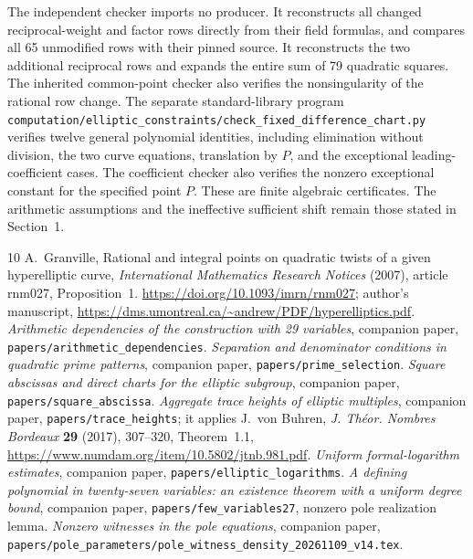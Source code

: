 \documentclass[11pt,a4paper]{article}
\begin{document}
The independent checker imports no producer. It reconstructs all
changed reciprocal-weight and factor rows directly from their field
formulas, and compares all 65 unmodified rows with their pinned source.
It reconstructs the two additional reciprocal rows and expands the
entire sum of 79 quadratic squares. The inherited common-point checker
also verifies the nonsingularity of the rational row change. The separate
standard-library program
\nolinkurl{computation/elliptic_constraints/check_fixed_difference_chart.py}
verifies twelve general polynomial identities, including elimination
without division, the two curve equations, translation by $P$, and the
exceptional leading-coefficient cases. The coefficient checker also
verifies the nonzero exceptional constant for the specified point $P$.
These are finite algebraic certificates. The arithmetic assumptions and
the ineffective sufficient shift remain those stated in Section~1.

\begin{thebibliography}{10}
A.~Granville, Rational and integral points on quadratic twists of a given
hyperelliptic curve, \emph{International Mathematics Research Notices}
(2007), article rnm027, Proposition~1.
\url{https://doi.org/10.1093/imrn/rnm027}; author's manuscript,
\url{https://dms.umontreal.ca/~andrew/PDF/hyperelliptics.pdf}.
\emph{Arithmetic dependencies of the construction with 29 variables},
companion paper, \nolinkurl{papers/arithmetic_dependencies}.
\emph{Separation and denominator conditions in quadratic prime patterns},
companion paper, \nolinkurl{papers/prime_selection}.
\emph{Square abscissas and direct charts for the elliptic subgroup},
companion paper, \nolinkurl{papers/square_abscissa}.
\emph{Aggregate trace heights of elliptic multiples}, companion paper,
\nolinkurl{papers/trace_heights}; it applies J.~von Buhren,
\emph{J. Th\'eor. Nombres Bordeaux} \textbf{29} (2017), 307--320,
Theorem~1.1, \url{https://www.numdam.org/item/10.5802/jtnb.981.pdf}.
\emph{Uniform formal-logarithm estimates}, companion paper,
\nolinkurl{papers/elliptic_logarithms}.
\emph{A defining polynomial in twenty-seven variables: an existence
theorem with a uniform degree bound}, companion paper,
\nolinkurl{papers/few_variables27}, nonzero pole realization lemma.
\emph{Nonzero witnesses in the pole equations}, companion paper,
\nolinkurl{papers/pole_parameters/pole_witness_density_20261109_v14.tex}.
\end{thebibliography}
\end{document}
